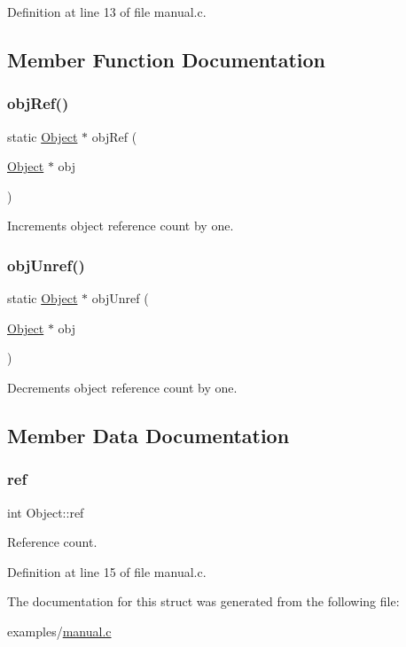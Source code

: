 Definition at line 13 of file manual.\+c.



\subsection{Member Function Documentation}
\mbox{\label{struct_object_a71225073d06a793b9a6ea9263ed37b12}} 
\subsubsection{\texorpdfstring{objRef()}{objRef()}}
{\footnotesize\ttfamily static \mbox{\hyperlink{struct_object}{Object}} $\ast$ obj\+Ref (\begin{DoxyParamCaption}\item[{\mbox{\hyperlink{struct_object}{Object}} $\ast$}]{obj }\end{DoxyParamCaption})}

Increments object reference count by one. \mbox{\label{struct_object_a924ee0cecc906d148022b3f0d6325cfb}} 
\subsubsection{\texorpdfstring{objUnref()}{objUnref()}}
{\footnotesize\ttfamily static \mbox{\hyperlink{struct_object}{Object}} $\ast$ obj\+Unref (\begin{DoxyParamCaption}\item[{\mbox{\hyperlink{struct_object}{Object}} $\ast$}]{obj }\end{DoxyParamCaption})}

Decrements object reference count by one. 

\subsection{Member Data Documentation}
\mbox{\label{struct_object_a1b6037fba835e83243ababce426ff9af}} 
\subsubsection{\texorpdfstring{ref}{ref}}
{\footnotesize\ttfamily int Object\+::ref\hspace{0.3cm}{\ttfamily [private]}}



Reference count. 



Definition at line 15 of file manual.\+c.



The documentation for this struct was generated from the following file\+:\begin{DoxyCompactItemize}
\item 
examples/\mbox{\hyperlink{manual_8c}{manual.\+c}}\end{DoxyCompactItemize}
